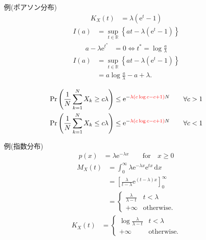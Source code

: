 \documentclass[lualatex,handout]{beamer}
\newcommand{\emm}[1]{\textcolor{red}{#1}}
\newcommand\dx{{\,\mathrm{d}x}}
\theoremstyle{definition}
\begin{document}
\begin{frame}{例(ポアソン分布)}
\begin{align*}
K_X(t) &= \lambda(\mathrm{e}^t-1)
\end{align*}
\begin{align*}
I(a)&=\sup_{t\in\mathbb{R}}\left\{at - \lambda(\mathrm{e}^t-1)\right\}
\end{align*}
\begin{align*}
a-\lambda\mathrm{e}^{t^*} &= 0\iff t^* = \log \frac{a}{\lambda}
\end{align*}
\begin{align*}
I(a)&=\sup_{t\in\mathbb{R}}\left\{at - \lambda(\mathrm{e}^t-1)\right\}\\
 &= a\log\frac{a}{\lambda} -a + \lambda.
\end{align*}

\vspace{.5em}
\begin{align*}
\Pr\left(\frac1N\sum_{k=1}^N X_k \ge c\lambda\right) &\le \mathrm{e}^{-\emm{\lambda\left(c\log c -c + 1 \right)}N}\qquad\forall c > 1\\
\Pr\left(\frac1N\sum_{k=1}^N X_k \le c\lambda\right) &\le \mathrm{e}^{-\emm{\lambda\left(c\log c -c + 1 \right)}N}\qquad\forall c < 1\\
\end{align*}
\end{frame}

\begin{frame}{例(指数分布)}
\begin{align*}
p(x) &= \lambda\mathrm{e}^{-\lambda x}\qquad\text{for}\quad x\ge 0
\end{align*}
\begin{align*}
M_X(t) &= \int_{0}^\infty \lambda\mathrm{e}^{-\lambda x} \mathrm{e}^{tx}\dx\\
&=\left[\frac{\lambda}{t-\lambda}\mathrm{e}^{(t-\lambda)x}\right]_0^{\infty}\\
&=\begin{cases}
\frac{\lambda}{\lambda-t}& t < \lambda\\
+\infty&\text{otherwise.}
\end{cases}
\end{align*}
\begin{align*}
K_X(t) &=
\begin{cases}
\log\frac{\lambda}{\lambda-t}& t < \lambda\\
+\infty&\text{otherwise.}
\end{cases}
\end{align*}
\end{frame}
\end{document}
